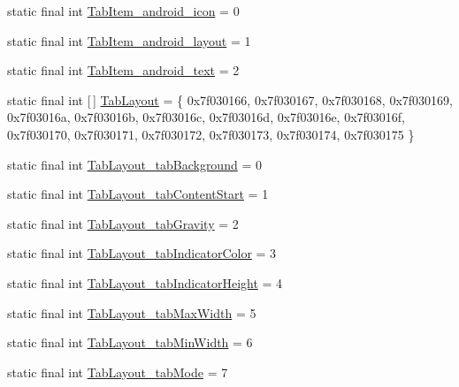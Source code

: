 \begin{DoxyCompactItemize}
static final int \mbox{\hyperlink{classandroid_1_1support_1_1design_1_1_r_1_1styleable_a46e96d73ebab77295be1e1a6df14c775}{Tab\+Item\+\_\+android\+\_\+icon}} = 0
\item 
static final int \mbox{\hyperlink{classandroid_1_1support_1_1design_1_1_r_1_1styleable_a11150619c6879db4f36afaecf7ae8353}{Tab\+Item\+\_\+android\+\_\+layout}} = 1
\item 
static final int \mbox{\hyperlink{classandroid_1_1support_1_1design_1_1_r_1_1styleable_a4c370f3b8f02d1e75f784cff6dfbcd35}{Tab\+Item\+\_\+android\+\_\+text}} = 2
\item 
static final int \mbox{[}$\,$\mbox{]} \mbox{\hyperlink{classandroid_1_1support_1_1design_1_1_r_1_1styleable_a514b47b47f600f9421b65f4f0aa832d6}{Tab\+Layout}} = \{ 0x7f030166, 0x7f030167, 0x7f030168, 0x7f030169, 0x7f03016a, 0x7f03016b, 0x7f03016c, 0x7f03016d, 0x7f03016e, 0x7f03016f, 0x7f030170, 0x7f030171, 0x7f030172, 0x7f030173, 0x7f030174, 0x7f030175 \}
\item 
static final int \mbox{\hyperlink{classandroid_1_1support_1_1design_1_1_r_1_1styleable_a820be00d91c860d611f8d23069a85668}{Tab\+Layout\+\_\+tab\+Background}} = 0
\item 
static final int \mbox{\hyperlink{classandroid_1_1support_1_1design_1_1_r_1_1styleable_a5b71a6c0e3a9a65823285cd0c3ab9e41}{Tab\+Layout\+\_\+tab\+Content\+Start}} = 1
\item 
static final int \mbox{\hyperlink{classandroid_1_1support_1_1design_1_1_r_1_1styleable_a7ae8ebe621a45d0943d8ab3dce402abc}{Tab\+Layout\+\_\+tab\+Gravity}} = 2
\item 
static final int \mbox{\hyperlink{classandroid_1_1support_1_1design_1_1_r_1_1styleable_a9b013b480dde8c6e5d57cd6ebd0d0f53}{Tab\+Layout\+\_\+tab\+Indicator\+Color}} = 3
\item 
static final int \mbox{\hyperlink{classandroid_1_1support_1_1design_1_1_r_1_1styleable_a7ae176dd4e8e0311f4bfa88d08f2691a}{Tab\+Layout\+\_\+tab\+Indicator\+Height}} = 4
\item 
static final int \mbox{\hyperlink{classandroid_1_1support_1_1design_1_1_r_1_1styleable_a3eb1307137e3900d48a4bc5a2f5a739f}{Tab\+Layout\+\_\+tab\+Max\+Width}} = 5
\item 
static final int \mbox{\hyperlink{classandroid_1_1support_1_1design_1_1_r_1_1styleable_a3602c5888987ab2e5b541ec404fd7f6d}{Tab\+Layout\+\_\+tab\+Min\+Width}} = 6
\item 
static final int \mbox{\hyperlink{classandroid_1_1support_1_1design_1_1_r_1_1styleable_a26a51530c7b6149480742863d85d168a}{Tab\+Layout\+\_\+tab\+Mode}} = 7

\end{DoxyCompactItemize}
